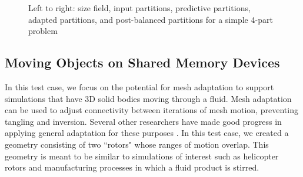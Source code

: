 \begin{figure}
\begin{center}
\caption{Left to right: size field, input partitions, predictive partitions,
adapted partitions, and post-balanced partitions
for a simple 4-part problem}
\label{fig:tall}
\end{center}
\end{figure}

\subsection{Moving Objects on Shared Memory Devices}

In this test case, we focus on the potential for mesh adaptation to support simulations
that have 3D solid bodies moving through a fluid.
Mesh adaptation can be used to adjust connectivity between iterations of
mesh motion, preventing tangling and inversion.
Several other researchers have made good progress in applying general adaptation
for these purposes
\cite{compere2010mesh,wicke2010dynamic,clausen2013simulating,chen2015parallel}.
In this test case, we created a geometry consisting of two ``rotors" whose ranges of
motion overlap.
This geometry is meant to be similar to simulations of interest such as
helicopter rotors and manufacturing processes in which a fluid product is
stirred.

